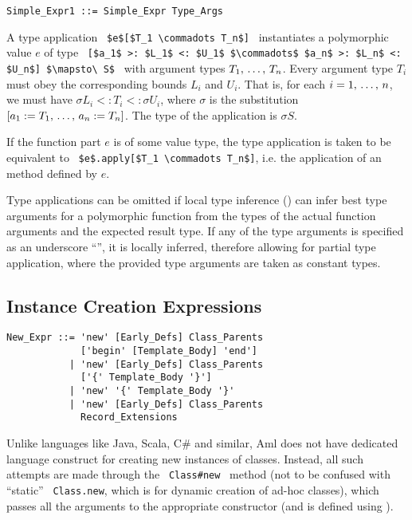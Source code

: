 \syntax\begin{lstlisting}
Simple_Expr1 ::= Simple_Expr Type_Args
\end{lstlisting}

A type application ~\lstinline!$e$[$T_1 \commadots T_n$]!~ instantiates a polymorphic value $e$ of type ~\lstinline![$a_1$ >: $L_1$ <: $U_1$ $\commadots$ $a_n$ >: $L_n$ <: $U_n$] $\mapsto\ S$!~ with argument types $T_1 ,\, \ldots ,\, T_n$. Every argument type $T_i$ must obey the corresponding bounds $L_i$ and $U_i$. That is, for each $i = 1 ,\, \ldots ,\, n$, we must have $\sigma L_i <: T_i <: \sigma U_i$, where $\sigma$ is the substitution $[a_1 := T_1 ,\, \ldots ,\, a_n := T_n]$. The type of the application is $\sigma S$. 

If the function part $e$ is of some value type, the type application is taken to be equivalent to ~\lstinline!$e$.apply[$T_1 \commadots T_n$]!, i.e. the application of an  method defined by $e$. 

Type applications can be omitted if local type inference () can infer best type arguments for a polymorphic function from the types of the actual function arguments and the expected result type. If any of the type arguments is specified as an underscore ``\code{_}'', it is locally inferred, therefore allowing for partial type application, where the provided type arguments are taken as constant types. 





\subsection{Instance Creation Expressions}
\label{sec:instance-creation-exprs}

\syntax\begin{lstlisting}
New_Expr ::= 'new' [Early_Defs] Class_Parents 
             ['begin' [Template_Body] 'end']
           | 'new' [Early_Defs] Class_Parents 
             ['{' Template_Body '}']
           | 'new' '{' Template_Body '}'
           | 'new' [Early_Defs] Class_Parents 
             Record_Extensions
\end{lstlisting}

Unlike languages like Java, Scala, C\# and similar, Aml does not have dedicated language construct for creating new instances of classes. Instead, all such attempts are made through the ~\lstinline[deletekeywords={new}]!Class#new!~ method (not to be confused with ``static'' ~\lstinline[deletekeywords={new}]@Class.new@, which is for dynamic creation of ad-hoc classes), which passes all the arguments to the appropriate constructor (and is defined using ). 

